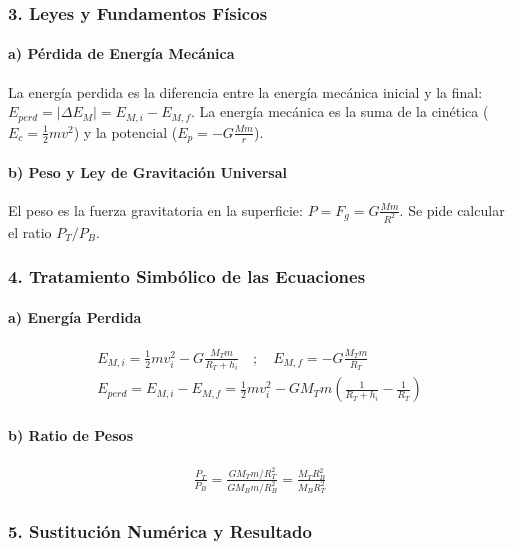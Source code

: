 \subsubsection*{3. Leyes y Fundamentos Físicos}
\paragraph*{a) Pérdida de Energía Mecánica}
La energía perdida es la diferencia entre la energía mecánica inicial y la final: $E_{perd} = | \Delta E_M | = E_{M,i} - E_{M,f}$. La energía mecánica es la suma de la cinética ($E_c = \frac{1}{2}mv^2$) y la potencial ($E_p = -G\frac{Mm}{r}$).
\paragraph*{b) Peso y Ley de Gravitación Universal}
El peso es la fuerza gravitatoria en la superficie: $P = F_g = G\frac{M m}{R^2}$. Se pide calcular el ratio $P_T/P_B$.

\subsubsection*{4. Tratamiento Simbólico de las Ecuaciones}
\paragraph*{a) Energía Perdida}
\begin{gather}
    E_{M,i} = \frac{1}{2}mv_i^2 - G\frac{M_T m}{R_T+h_i} \quad ; \quad E_{M,f} = -G\frac{M_T m}{R_T} \\
    E_{perd} = E_{M,i} - E_{M,f} = \frac{1}{2}mv_i^2 - G M_T m \left(\frac{1}{R_T+h_i} - \frac{1}{R_T}\right)
\end{gather}
\paragraph*{b) Ratio de Pesos}
\begin{gather}
    \frac{P_T}{P_B} = \frac{G M_T m / R_T^2}{G M_B m / R_B^2} = \frac{M_T R_B^2}{M_B R_T^2}
\end{gather}

\subsubsection*{5. Sustitución Numérica y Resultado}
